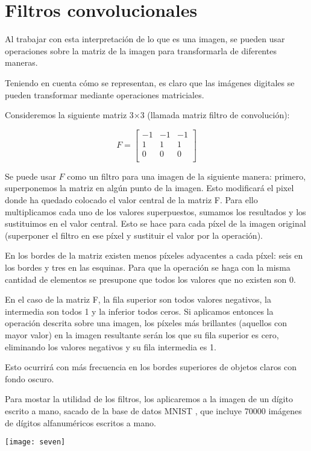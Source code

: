 \section{Filtros convolucionales}

Al trabajar con esta interpretación de lo que es una imagen, se pueden usar operaciones sobre la matriz de la imagen para transformarla de diferentes maneras.

Teniendo en cuenta cómo se representan, es claro que las imágenes digitales se pueden transformar mediante operaciones matriciales.

Consideremos la siguiente matriz 3$\times$3 (llamada matriz filtro de convolución):

\[
  F=
  \left[ {\begin{array}{ccc}
   -1 & -1 & -1 \\
   1 & 1 & 1 \\
   0 & 0 & 0 \\
  \end{array} } \right]
\]

Se puede usar $F$ como un filtro para una imagen de la siguiente manera: primero, superponemos la matriz en algún punto de la imagen. Esto modificará el pixel donde ha quedado colocado el valor central de la matriz F. Para ello multiplicamos cada uno de los valores superpuestos, sumamos los resultados y los sustituimos en el valor central. Esto se hace para cada píxel de la imagen original (superponer el filtro en ese píxel y sustituir el valor por la operación).

En los bordes de la matriz existen menos píxeles adyacentes a cada píxel: seis en los bordes y tres en las esquinas. Para que la operación se haga con la misma cantidad de elementos se presupone que todos los valores que no existen son 0.

En el caso de la matriz F, la fila superior son todos valores negativos, la intermedia son todos 1 y la inferior todos ceros. Si aplicamos entonces la operación descrita sobre una imagen, los píxeles más brillantes (aquellos con mayor valor) en la imagen resultante serán los que su fila superior es cero, eliminando los valores negativos y su fila intermedia es 1. 

Esto ocurrirá con más frecuencia en los bordes superiores de objetos claros con fondo oscuro.

Para mostar la utilidad de los filtros, los aplicaremos a la imagen de un dígito escrito a mano, sacado de la base de datos MNIST \parencite{lecun-mnisthandwrittendigit-2010}, que incluye 70000 imágenes de dígitos alfanuméricos escritos a mano.
\begin{center}
  \texttt{[image: seven]}
\end{center}

